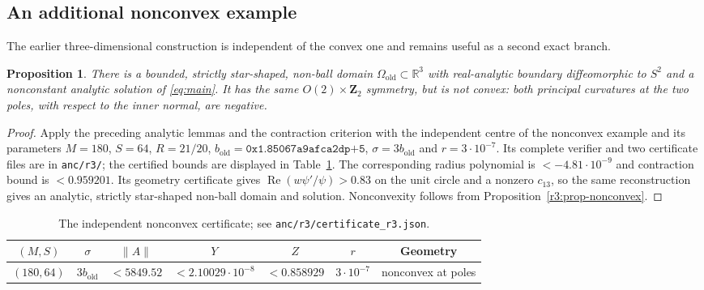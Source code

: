 \documentclass[11pt]{amsart}
\newtheorem{proposition}[theorem]{Proposition}
\theoremstyle{definition}
\theoremstyle{remark}
\numberwithin{equation}{section}
\newcommand{\R}{\mathbb{R}}
\DeclareMathOperator{\re}{Re}
\newcommand{\nrm}[1]{\lVert #1\rVert}
\begin{document}
\subsection{An additional nonconvex example}\label{r3:sec-AX3}
The earlier three-dimensional construction is independent of the convex one and remains useful as a second exact branch.
\begin{proposition}\label{r3:prop-AX3}
There is a bounded, strictly star-shaped, non-ball domain $\Omega_{\mathrm{old}}\subset\R^3$ with real-analytic boundary diffeomorphic to $S^2$ and a nonconstant analytic solution of \eqref{eq:main}. It has the same $O(2)\times\mathbf Z_2$ symmetry, but is not convex: both principal curvatures at the two poles, with respect to the inner normal, are negative.
\end{proposition}
\begin{proof}
Apply the preceding analytic lemmas and the contraction criterion with the independent centre of the nonconvex example and its parameters $M=180$, $S=64$, $R=21/20$, $b_{\mathrm{old}}=\texttt{0x1.85067a9afca2dp+5}$, $\sigma=3b_{\mathrm{old}}$ and $r=3\cdot10^{-7}$. Its complete verifier and two certificate files are in \texttt{anc/r3/}; the certified bounds are displayed in Table~\ref{r3:tab-old}. The corresponding radius polynomial is $<-4.81\cdot10^{-9}$ and contraction bound is $<0.959201$. Its geometry certificate gives $\re(w\psi'/\psi)>0.83$ on the unit circle and a nonzero $c_{13}$, so the same reconstruction gives an analytic, strictly star-shaped non-ball domain and solution. Nonconvexity follows from Proposition~\ref{r3:prop-nonconvex}.
\end{proof}
\begin{table}[ht]
\centering\footnotesize
\begin{tabular}{@{}ccccccc@{}}
\toprule
$(M,S)$ & $\sigma$ & $\nrm A$ & $Y$ & $Z$ & $r$ & Geometry\\
\midrule
$(180,64)$ & $3b_{\mathrm{old}}$ & $<5849.52$ & $<2.10029\cdot10^{-8}$ & $<0.858929$ & $3\cdot10^{-7}$ & nonconvex at poles\\
\bottomrule
\end{tabular}
\caption{The independent nonconvex certificate; see \texttt{anc/r3/certificate\_r3.json}.}
\label{r3:tab-old}
\end{table}
\end{document}
